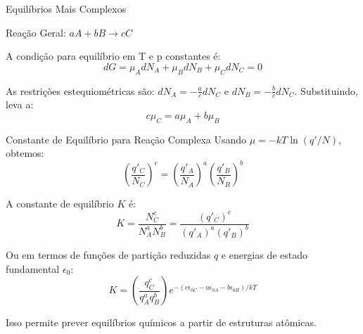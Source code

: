 \documentclass{beamer}
\begin{document}
\begin{frame}{Equilíbrios Mais Complexos}
    \begin{block}{Reação Geral: $aA + bB \rightarrow cC$}
        
        A condição para equilíbrio em T e p constantes é:
        $$ dG = \mu_A dN_A + \mu_B dN_B + \mu_C dN_C = 0 $$
         
        As restrições estequiométricas são:
        $ dN_A = -\frac{a}{c}dN_C $ e $ dN_B = -\frac{b}{c}dN_C $.  
        Substituindo, leva a:
        $$ c\mu_C = a\mu_A + b\mu_B $$
        
    \end{block}
    
    \begin{block}{Constante de Equilíbrio para Reação Complexa}
        Usando $\mu = -kT \ln(q'/N)$, obtemos:
        $$ \left(\frac{q'_C}{N_C}\right)^c = \left(\frac{q'_A}{N_A}\right)^a \left(\frac{q'_B}{N_B}\right)^b $$
         
        A constante de equilíbrio $K$ é:
        $$ K = \frac{N_C^c}{N_A^a N_B^b} = \frac{(q'_C)^c}{(q'_A)^a (q'_B)^b} $$
        
        Ou em termos de funções de partição reduzidas $q$ e energias de estado fundamental $\epsilon_0$:
        $$ K = \left(\frac{q_C^c}{q_A^a q_B^b}\right) e^{-(c\epsilon_{0C} - a\epsilon_{0A} - b\epsilon_{0B})/kT} $$
        
        Isso permite prever equilíbrios químicos a partir de estruturas atômicas. 
    \end{block}
\end{frame}
\end{document}
